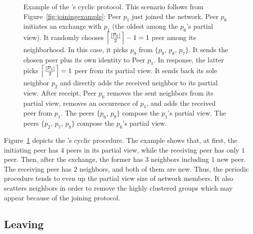 \begin{figure}
  \centering
  
  \caption{\label{fig:cyclicexample}Example of the \SCAMPLON{}'s cyclic
    protocol. This scenario follows from Figure~\ref{fig:joiningexample}: Peer
    $p_1$ just joined the network. Peer $p_6$ initiates an exchange with $p_1$
    (the oldest among the $p_6$'s partial view). It randomly chooses
    $\left\lceil{|\mathcal{P}_6|\over{2}}\right\rceil-1 = 1$ peer among its
    neighborhood. In this case, it picks $p_9$ from $\{p_9,\,p_8,\,p_7\}$.  It
    sends the chosen peer plus its own identity to Peer $p_1$. In response, the
    latter picks $\left\lceil{|\mathcal{P}_1|\over{2}}\right\rceil = 1$ peer
    from its partial view. It sends back its sole neighbor $p_2$ and directly
    adds the received neighbor to its partial view. After receipt, Peer $p_6$
    removes the sent neighbors from its partial view, removes an occurrence of
    $p_1$, and adds the received peer from $p_1$. The peers $\{p_6,\,p_9\}$
    compose the $p_1$'s partial view. The peers $\{p_2,\,p_7,\,p_8\}$ compose
    the $p_6$'s partial view.}
\end{figure}

Figure~\ref{fig:cyclicexample} depicts the \SCAMPLON{}'s cyclic procedure. The
example shows that, at first, the initiating peer has $4$ peers in its partial
view, while the receiving peer has only $1$ peer. Then, after the exchange, the
former has $3$ neighbors including $1$ new peer. The receiving peer has $2$
neighbors, and both of them are new. Thus, the periodic procedure tends to
even up the partial view size of network members. It also scatters neighbors in
order to remove the highly clustered groups which may appear because of the
joining protocol.

\subsection{Leaving}
\label{subsec:leaving}

